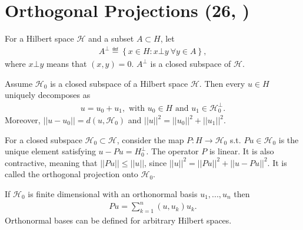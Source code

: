 \section{Orthogonal Projections \tiny{(26, \cite{schilling2017measures})}}
For a Hilbert space \(\mathcal{H}\) and a subset \(A\subset H\), let
\begin{align*}
    A^{\bot} \eqdef \left\{x\in H: x\bot y\ \forall y \in A\right\},
\end{align*}
where \(x\bot y\) means that \((x,y) = 0\). \(A^{\bot}\) is a closed subspace of \(\mathcal{H}\).
\begin{proposition}
    Assume \(\mathcal{H}_0\) is a closed subspace of a Hilbert space \(\mathcal{H}\). Then every \(u\in H\) uniquely decomposes as
    \begin{align*}
        u = u_0 + u_1, \text{ with } u_0\in H \text{ and } u_1 \in \mathcal{H}_{0}^{\bot}.
    \end{align*}
    Moreover, \(||u - u_0||= d(u,\mathcal{H}_0)\) and \(||u||^2 = ||u_0||^2 + ||u_1||^2\).
\end{proposition}

For a closed subspace \(\mathcal{H}_0\subset \mathcal{H}\), consider the map \(P:H\rightarrow \mathcal{H}_0\) s.t.
\(Pu\in \mathcal{H}_0\) is the unique element satisfying \(u-Pu = H_{0}^{\bot}\). The operator \(P\) is linear. It is also contractive, meaning that
\(||Pu||\leq ||u||\), since \(||u||^2 = ||Pu||^2 + ||u-Pu||^2\). It is called the orthogonal projection onto \(\mathcal{H}_0\).

If \(\mathcal{H}_0\) is finite dimensional with an orthonormal basis \(u_1, ..., u_n\) then 
\begin{align*}
    Pu = \sum\limits^{n}_{k=1} (u,u_k)u_k.
\end{align*}
Orthonormal bases can be defined for arbitrary Hilbert spaces. 

